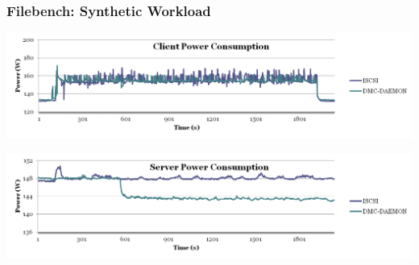 \documentclass{beamer}
\begin{document}
\begin{frame}
\end{frame}

\begin{frame}
  \frametitle{Filebench: Synthetic Workload}

  \includegraphics[height=0.4\textheight,width=\textwidth,keepaspectratio]{client-power.png}

  \includegraphics[height=0.4\textheight,width=\textwidth,keepaspectratio]{server-power.png}

\end{frame}
\end{document}
